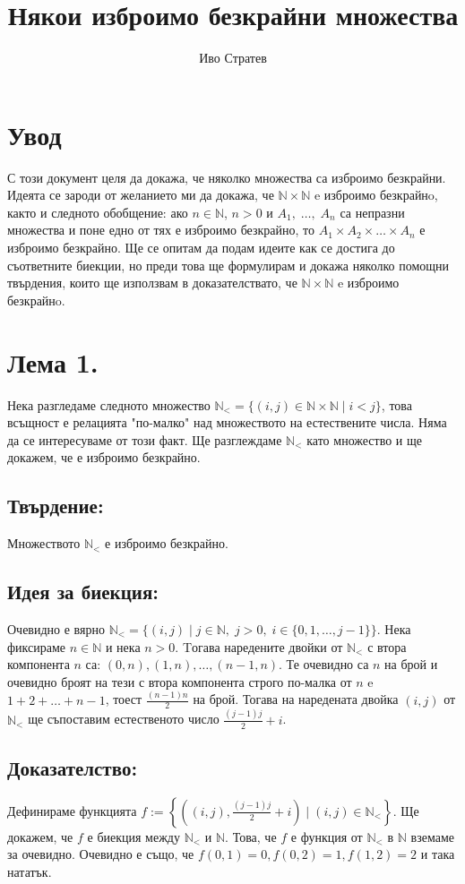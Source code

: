\documentclass[a4paper, 12pt, oneside]{article}
\title{Някои изброимо безкрайни множества}
\author{Иво Стратев}
\newcommand{\N}{\mathbb{N}}
\newcommand{\LN}{\N_<}
\begin{document}
\maketitle
\section*{Увод}
С този документ целя да докажа, че няколко множества са изброимо безкрайни.
Идеята се зароди от желанието ми да докажа, че \(\N\times\N\) e изброимо безкрайнo,
както и следното обобщение: ако \(n \in \N\), \(n > 0\) и \(A_1, \; \dots, \; A_n\)
са непразни множества и поне едно от тях е изброимо безкрайно,
то \(A_1 \times A_2 \times \dots \times A_n\) е изброимо безкрайно.
Ще се опитам да подам идеите как се достига до съответните биекции,
но преди това ще формулирам и докажа няколко помощни твърдения,
които ще използвам в доказателствато, че \(\N\times\N\) e изброимо безкрайнo.
\section*{Лема 1.}
Нека разгледаме следното множество \(\LN = \{(i, j) \in \N\times\N \; | \; i < j\}\),
това всъщност е релацията "по-малко" над множеството на естествените числа.
Няма да се интересуваме от този факт. Ще разглеждаме \(\LN\) като множество и ще докажем,
че е изброимо безкрайно.
\subsection*{Твърдение:}
Множеството \(\LN\) е изброимо безкрайно.
\subsection*{Идея за биекция:}
Очевидно е вярно \(\LN = \{(i, j) \; | \; j \in \N, \; j > 0, \; i \in \{0, 1, \dots, j - 1\}\}\).
Нека фиксираме \(n \in \N\) и нека \(n > 0\). Tогава наредените двойки от \(\LN\)
с втора компонента \(n\) са: \((0, n), (1, n), \dots, (n - 1, n)\).
Те очевидно са \(n\) на брой и очевидно броят на тези с втора компонента строго по-малка от \(n\)
e \(1 + 2 + \dots + n - 1\), тоест \(\displaystyle\frac{(n - 1)n}{2}\) на брой.
Тогава на наредената двойка \((i, j)\) от \(\LN\) ще съпоставим естественото число \(\displaystyle\frac{(j - 1)j}{2} + i\). 
\subsection*{Доказателство:}
Дефинираме функцията \(f := \left\{\left((i, j), \displaystyle\frac{(j - 1)j}{2} + i\right) \; \Big| \; (i, j) \in \LN \right\}\).
Ще докажем, че \(f\) е биекция между \(\LN\) и \(\N\). Това, че \(f\) е функция от \(\LN\) в \(\N\) вземаме за очевидно.
Очевидно е също, че \(f(0, 1) = 0, f(0, 2) = 1, f(1, 2) = 2\) и така нататък.
\end{document}
